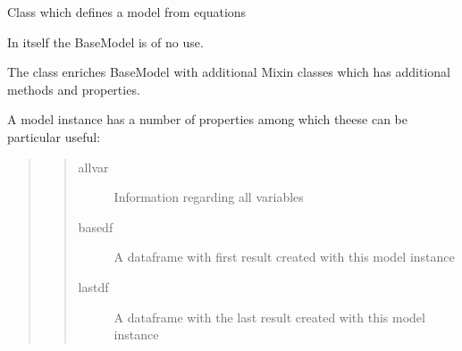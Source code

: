 \documentclass[letterpaper,10pt,english]{sphinxmanual}
\begin{document}

\begin{fulllineitems}
\label{\detokenize{index:modelclass.BaseModel}}
\pysigstartsignatures
{}
\pysigstopsignatures
\sphinxAtStartPar
Class which defines a model from equations

\sphinxAtStartPar
In itself the BaseModel is of no use.

\sphinxAtStartPar
The  class enriches BaseModel with additional
Mixin classes which has additional methods and properties.

\sphinxAtStartPar
A model instance has a number of properties among which theese can be particular useful:
\begin{quote}
\begin{quote}\begin{description}
\item[{allvar}] \leavevmode
\sphinxAtStartPar
Information regarding all variables

\item[{basedf}] \leavevmode
\sphinxAtStartPar
A dataframe with first result created with this model instance

\item[{lastdf}] \leavevmode
\sphinxAtStartPar
A dataframe with the last result created with this model instance

\end{description}\end{quote}
\end{quote}


\end{fulllineitems}
\end{document}
